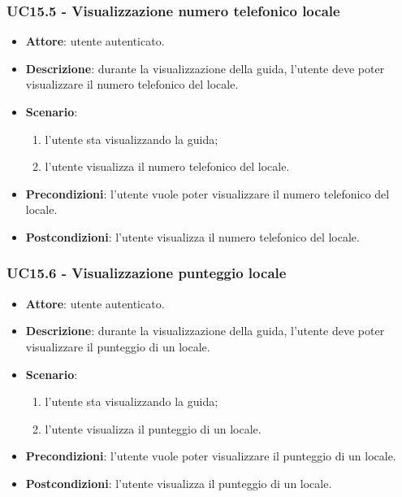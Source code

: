 \subsubsection{UC15.5 - Visualizzazione numero telefonico locale}
\begin{itemize}
    \item \textbf{Attore}: utente autenticato.
    \item \textbf{Descrizione}: durante la visualizzazione della guida, l'utente deve poter visualizzare il numero telefonico del locale.
    \item \textbf{Scenario}:
    \begin{enumerate}
        \item l'utente sta visualizzando la guida;
        \item l'utente visualizza il numero telefonico del locale.
    \end{enumerate}
    \item \textbf{Precondizioni}: l'utente vuole poter visualizzare il numero telefonico del locale.
    \item \textbf{Postcondizioni}: l'utente visualizza il numero telefonico del locale.
\end{itemize}
 

\subsubsection{UC15.6 - Visualizzazione punteggio locale}
\begin{itemize}
    \item \textbf{Attore}: utente autenticato.
    \item \textbf{Descrizione}: durante la visualizzazione della guida, l'utente deve poter visualizzare il punteggio di un locale.
    \item \textbf{Scenario}:
    \begin{enumerate}
        \item l'utente sta visualizzando la guida;
        \item l'utente visualizza il punteggio di un locale.
    \end{enumerate}
    \item \textbf{Precondizioni}: l'utente vuole poter visualizzare il punteggio di un locale.
    \item \textbf{Postcondizioni}: l'utente visualizza il punteggio di un locale.
\end{itemize}

